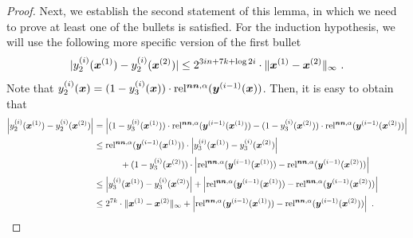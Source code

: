 \begin{proof}
    Next, we establish the second statement of this lemma, in which we need to prove at least one of the bullets is satisfied.
    For the induction hypothesis, we will use the following more specific version of the first bullet 
    \[
        |{y_2^{(i)}(\boldsymbol{x}^{(1)})-y_2^{(i)}(\boldsymbol{x}^{(2)})} |\leq 2^{3in+7k+\log  2i}\cdot \| {\boldsymbol{x}^{(1)}-\boldsymbol{x}^{(2)}} \|_{\infty}~.
    \]
    Note that $y_2^{(i)}(\boldsymbol{x})=(1-y_3^{(i)}(\boldsymbol{x}))\cdot \operatorname*{rel^{\boldsymbol{nn},\alpha}}(\boldsymbol{y}^{(i-1)}(\boldsymbol{x}))$. 
    Then, it is easy to obtain that
    \begin{align*}
        \left |{y_2^{(i)}(\boldsymbol{x}^{(1)})-y_2^{(i)}(\boldsymbol{x}^{(2)})} \right | 
        &= 
        \left |{(1-y_3^{(i)}(\boldsymbol{x}^{(1)}))\cdot \operatorname*{rel^{\boldsymbol{nn},\alpha}}(\boldsymbol{y}^{(i-1)}(\boldsymbol{x}^{(1)})) - (1-y_3^{(i)}(\boldsymbol{x}^{(2)}))\cdot \operatorname*{rel^{\boldsymbol{nn},\alpha}}(\boldsymbol{y}^{(i-1)}(\boldsymbol{x}^{(2)}))} \right |
        \\
        &\leq
        \operatorname*{rel^{\boldsymbol{nn},\alpha}}(\boldsymbol{y}^{(i-1)}(\boldsymbol{x}^{(1)}))\cdot \left |{y_3^{(i)}(\boldsymbol{x}^{(1)})-y_3^{(i)}(\boldsymbol{x}^{(2)})} \right | 
        \\
        & \qquad \quad + (1-y_3^{(i)}(\boldsymbol{x}^{(2)})) \cdot \left |{\operatorname*{rel^{\boldsymbol{nn},\alpha}}(\boldsymbol{y}^{(i-1)}(\boldsymbol{x}^{(1)})) - \operatorname*{rel^{\boldsymbol{nn},\alpha}}(\boldsymbol{y}^{(i-1)}(\boldsymbol{x}^{(2)})) } \right |
        \\
        &\leq
        \left |{y_3^{(i)}(\boldsymbol{x}^{(1)})-y_3^{(i)}(\boldsymbol{x}^{(2)})} \right | + \left |{\operatorname*{rel^{\boldsymbol{nn},\alpha}}(\boldsymbol{y}^{(i-1)}(\boldsymbol{x}^{(1)})) - \operatorname*{rel^{\boldsymbol{nn},\alpha}}(\boldsymbol{y}^{(i-1)}(\boldsymbol{x}^{(2)})) } \right |
        \\
        &\leq 
        2^{7k}\cdot \| {\boldsymbol{x}^{(1)}-\boldsymbol{x}^{(2)}} \|_{\infty} + \left |{\operatorname*{rel^{\boldsymbol{nn},\alpha}}(\boldsymbol{y}^{(i-1)}(\boldsymbol{x}^{(1)})) - \operatorname*{rel^{\boldsymbol{nn},\alpha}}(\boldsymbol{y}^{(i-1)}(\boldsymbol{x}^{(2)})) } \right |~.
    \end{align*}


\end{proof}
